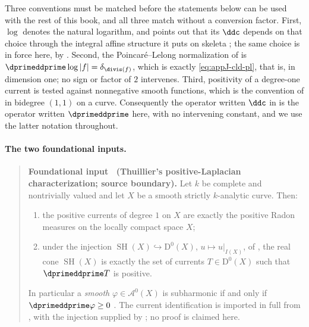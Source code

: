 \begin{remark}[Normalizations]
\label{rem:ch15-thuillier-normalization}
Three conventions must be matched before the statements below can be used
with the rest of this book, and all three match without a conversion factor.
First, $\log$ denotes the natural logarithm, and \cite{Thu05} points out
that its $\ddc$ depends on that choice through the integral affine structure
it puts on skeleta \cite[Remarque~3.3.16]{Thu05}; the same choice is in force
here, by .  Second, the Poincar\'e--Lelong
normalization of
\cite[Proposition~3.3.15]{Thu05} is
$\dprimeddprime\log|f|=\delta_{\divis(f)}$, which is exactly
\eqref{eq:appJ-cld-pl}, that is,  in dimension
one; no sign or factor of $2$ intervenes.  Third, positivity of a degree-one
current is tested against nonnegative smooth functions, which is the
convention of  in bidegree $(1,1)$ on a curve.
Consequently the operator written $\ddc$ in \cite{Thu05} is the
operator written $\dprimeddprime$ here, with no intervening constant, and we
use the latter notation throughout.
\end{remark}

\paragraph{The two foundational inputs.}

\label{thm:ch15-thuillier-currents}
\begin{quote}
\textbf{Foundational input \thetheorem\ (Thuillier's positive-Laplacian
characterization; source boundary).}
Let $k$ be complete and nontrivially valued and let $X$ be a smooth strictly
$k$-analytic curve.  Then:
\begin{enumerate}
\item\label{itm:ch15-thu-measures} the positive currents of degree $1$ on
  $X$ are exactly the positive Radon measures on the locally compact space
  $X$;
\item\label{itm:ch15-thu-identification} under the injection
  $\operatorname{SH}(X)\hookrightarrow\mathrm D^0(X)$, $u\mapsto u|_{I(X)}$, of
  \cite[Lemme~3.4.1]{Thu05}, the real cone $\operatorname{SH}(X)$ is exactly the set of
  currents $T\in\mathrm D^0(X)$ such that $\dprimeddprime T$ is positive.
\end{enumerate}
In particular a \emph{smooth} $\varphi\in\mathcal A^0(X)$ is subharmonic if
and only if $\dprimeddprime\varphi\ge0$ \cite[Proposition~3.4.4]{Thu05}.
The current identification is imported in full from
\cite[Th\'eor\`eme~3.4.12]{Thu05}, with the injection supplied by
\cite[Lemme~3.4.1]{Thu05}; no proof is claimed here.
\end{quote}

